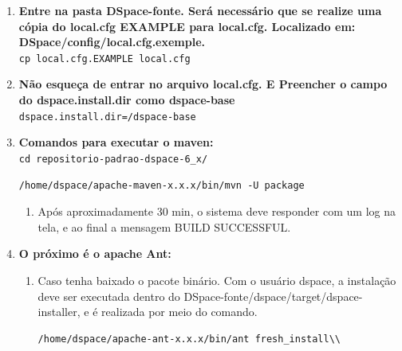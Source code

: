 \documentclass[12pt,hidelinks]{article}
\begin{document}
\begin{enumerate}
        \item \textbf{Entre na pasta DSpace-fonte.  Será necessário que se realize uma cópia do local.cfg EXAMPLE para local.cfg. Localizado em: DSpace/config/local.cfg.exemple.}\\
        
            \texttt{cp local.cfg.EXAMPLE local.cfg}\\
            
        \item \textbf{Não esqueça de entrar no arquivo local.cfg. E Preencher o campo do dspace.install.dir como dspace-base}\\
            
            \texttt{dspace.install.dir=/dspace-base}\\
        
        \item \textbf{Comandos para executar o maven:}\\
        
            \texttt{cd repositorio-padrao-dspace-6\_x/}\\
            
             \begin{verbatim}
/home/dspace/apache-maven-x.x.x/bin/mvn -U package
            \end{verbatim}
            
            \begin{enumerate}
            \item Após aproximadamente 30 min, o sistema deve responder com um log na tela, e ao final a mensagem BUILD SUCCESSFUL.\\

            \end{enumerate}
            
        \item \textbf{O próximo é o apache Ant:}\\
        
         \begin{enumerate}
            \item Caso tenha baixado o pacote binário. Com o usuário dspace, a instalação deve ser executada dentro do DSpace-fonte/dspace/target/dspace-installer, e é realizada por meio do comando.\\
            
                \begin{verbatim}
/home/dspace/apache-ant-x.x.x/bin/ant fresh_install\\
            \end{verbatim}
            

\end{enumerate}
\end{enumerate}
\end{document}
